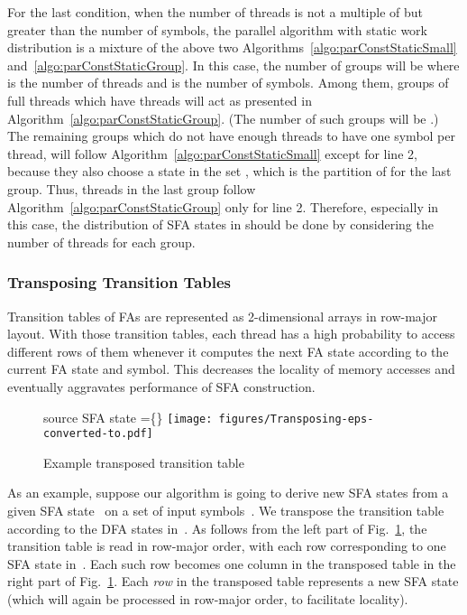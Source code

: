 \documentclass[10pt, conference, compsocconf]{IEEEtran}
\begin{document}
For the last condition, when the number of threads is not a multiple of but
greater than the number of symbols, the parallel algorithm with static work
distribution is a mixture of the above two Algorithms~\ref{algo:parConstStaticSmall}
and~\ref{algo:parConstStaticGroup}. In this case, the number of groups  will be
 where  is the number of threads
and  is the number of symbols. Among them, groups of
full threads which have  threads will act as
presented in Algorithm~\ref{algo:parConstStaticGroup}. (The number of
such groups will be
.)
The remaining groups which do not have enough threads to
have one symbol per thread, will follow Algorithm~\ref{algo:parConstStaticSmall}
except for line 2, because they also choose a state  in the set ,
which is the partition of  for the last group.
Thus, threads in the last group follow Algorithm~\ref{algo:parConstStaticGroup} only for
line 2. Therefore, especially in this case, the distribution of SFA states
in  should be done by considering the number of threads for each group.

\subsubsection{Transposing Transition Tables}
\label{subsubsec:Transposition}
Transition tables of FAs are represented as 2-dimensional arrays
in row-major layout.  With those
transition tables, each thread has a high probability to access different rows
of them whenever it computes the next FA state according to the current FA
state and symbol. This decreases the locality of memory accesses and
eventually aggravates performance of SFA construction.

\begin{figure}[htp]
\centering
    source SFA state =\{\}
    \texttt{[image: figures/Transposing-eps-converted-to.pdf]}
\caption{Example transposed transition table}
\label{fig:transposedTable}
\end{figure}

As an example, suppose our algorithm is going to derive new SFA states
 from a given SFA state~ on a set of input
symbols~. We transpose the transition
table~ according to the DFA states in~.  As follows from the left
part of Fig.~\ref{fig:transposedTable}, the transition table is read in
row-major order, with each row corresponding to one SFA state in~. Each
such row becomes one column in the transposed table in the right part of
Fig.~\ref{fig:transposedTable}.  Each {\em row\/} in the transposed table
represents a new SFA state (which will again be processed in row-major order,
to facilitate locality).
\end{document}
